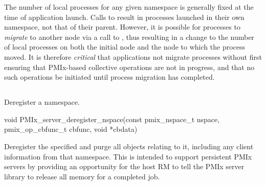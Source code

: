 \adviceuserstart
The number of local processes for any given namespace is generally fixed at the time of application launch. Calls to  result in processes launched in their own namespace, not that of their parent. However, it is possible for processes to \textit{migrate} to another node via a call to , thus resulting in a change to the number of local processes on both the initial node and the node to which the process moved. It is therefore \textit{critical} that applications not migrate processes without first ensuring that \ac{PMIx}-based collective operations are not in progress, and that no such operations be initiated until process migration has completed.
\adviceuserend



\subsection{}

\summary

Deregister a namespace.

\format

\cspecificstart
\begin{codepar}
void PMIx_server_deregister_nspace(const pmix_nspace_t nspace,
                        pmix_op_cbfunc_t cbfunc, void *cbdata)
\end{codepar}
\cspecificend

\begin{arglist}
\end{arglist}

\descr

Deregister the specified  and purge all objects relating to it, including any client information from that namespace.
This is intended to support persistent \ac{PMIx} servers by providing an opportunity for the host \ac{RM} to tell the \ac{PMIx} server library to release all memory for a completed job.



\subsection{}


